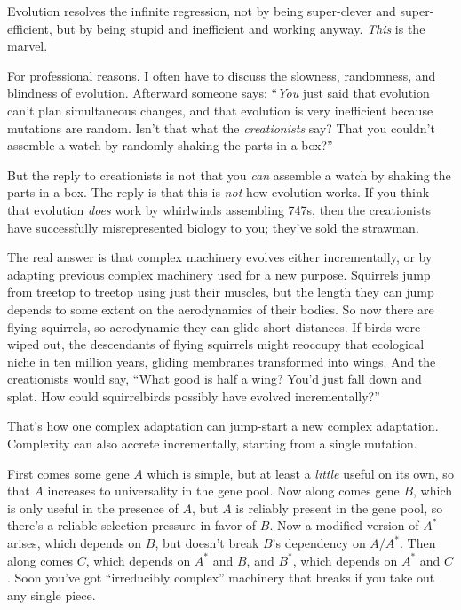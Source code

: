  Evolution resolves the infinite regression, not by being
super-clever and super-efficient, but by being stupid and inefficient
and working anyway. \textit{This} is the marvel.


 For professional reasons, I often have to discuss the slowness,
randomness, and blindness of evolution. Afterward someone says:
``\textit{You} just said that evolution
can't plan simultaneous changes, and that evolution is
very inefficient because mutations are random. Isn't
that what the \textit{creationists} say? That you
couldn't assemble a watch by randomly shaking the parts
in a box?''


 But the reply to creationists is not that you \textit{can}
assemble a watch by shaking the parts in a box. The reply is that this
is \textit{not} how evolution works. If you think that evolution
\textit{does} work by whirlwinds assembling 747s, then the creationists
have successfully misrepresented biology to you;
they've sold the strawman.


 The real answer is that complex machinery evolves either
incrementally, or by adapting previous complex machinery used for a new
purpose. Squirrels jump from treetop to treetop using just their
muscles, but the length they can jump depends to some extent on the
aerodynamics of their bodies. So now there are flying squirrels, so
aerodynamic they can glide short distances. If birds were wiped out,
the descendants of flying squirrels might reoccupy that ecological
niche in ten million years, gliding membranes transformed into wings.
And the creationists would say, ``What good is half a
wing? You'd just fall down and splat. How could
squirrelbirds possibly have evolved incrementally?''


 That's how one complex adaptation can jump-start a
new complex adaptation. Complexity can also accrete incrementally,
starting from a single mutation.


 First comes some gene $A$ which is simple, but at least a
\textit{little} useful on its own, so that $A$ increases to universality
in the gene pool. Now along comes gene $B$, which is only useful in the
presence of $A$, but $A$ is reliably present in the gene pool, so
there's a reliable selection pressure in favor of $B$.
Now a modified version of $A^{*}$ arises, which depends on
$B$, but doesn't break $B$'s dependency on
$A/A^{*}$. Then along comes $C$, which depends on
$A^{*}$ and $B$, and $B^{*}$, which depends on
$A^{*}$ and $C$. Soon you've got
``irreducibly complex'' machinery
that breaks if you take out any single piece.


